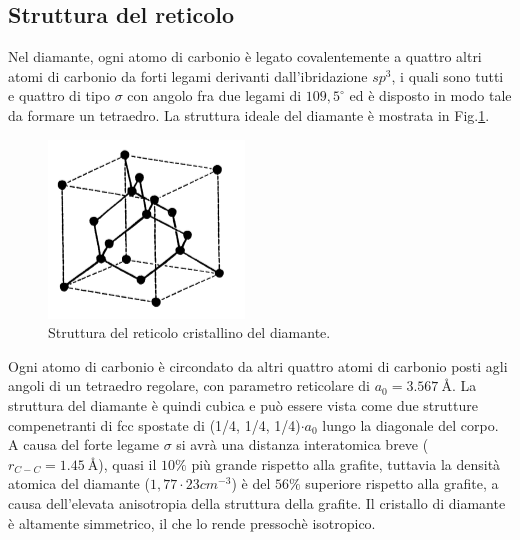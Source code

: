 \documentclass[a4paper,titlepage]{book}
\begin{document}
\subsection{Struttura del reticolo}
Nel diamante, ogni atomo di carbonio è legato covalentemente a quattro altri atomi di carbonio da forti legami derivanti dall'ibridazione $sp^3$, i quali sono tutti e quattro di tipo $\sigma$ con angolo fra due legami di $109,5^\circ$ ed è disposto in modo tale da formare un tetraedro.
La struttura ideale del diamante è mostrata in Fig.\ref{mond}.\\
 \begin{figure}[h!] 
	\centering
	\includegraphics[width=0.6\columnwidth]{diaman.png}
	\caption{ 	\label{mond}
		Struttura del reticolo cristallino del diamante.
	}
\end{figure}
Ogni atomo di carbonio è circondato da altri quattro atomi di carbonio posti agli angoli di un tetraedro regolare, con parametro reticolare di $a_0 = \SI{3.567}{\angstrom}$. La struttura del diamante è quindi cubica e può essere vista come due strutture compenetranti di fcc spostate di (1/4, 1/4, 1/4)$\cdot a_0$ lungo la diagonale del corpo. A causa del forte legame $\sigma$ si avrà una distanza interatomica  breve ($r_{C-C} =\SI{1,45}{\angstrom}$), quasi il $10\%$ più grande rispetto alla grafite, tuttavia la densità atomica del diamante ($1,77\cdot 23 cm^{-3}$) è del $56\%$ superiore rispetto alla grafite, a causa dell'elevata anisotropia della struttura della grafite. 
Il cristallo di diamante è altamente simmetrico, il che lo rende pressochè isotropico.
\end{document}
